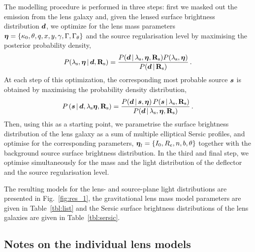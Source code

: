 \documentclass[a4paper,fleqn,usenatbib]{mnras}
\begin{document}
The modelling procedure is performed in three steps: first we masked out the emission from the lens galaxy and, given the lensed surface brightness distribution $\bmath d$, we optimize for the lens mass parameters $\bmath \eta = \{\kappa_0,\theta,q,x,y,\gamma,\Gamma,\Gamma_{\theta}\}$ and the source regularisation level by maximising the posterior probability density, 
\begin{equation}\label{equ:posterior}
    P(\lambda_{\rm{s}},\bmath \eta\,|\,\bmath d,\mathbf
      R_{\rm{s}})=\frac{P(\bmath d\,|\,\lambda_{\rm{s}},\bmath \eta,\mathbf
      R_{\rm{s}})P(\lambda_{\rm{s}},\bmath \eta)}{P(\bmath d\,|\,\mathbf
      R_{\rm{s}})}\,.
\end{equation}
At each step of this optimization, the corresponding most probable source $\bmath s$ is obtained by maximising the probability density distribution,
\begin{equation}
    P\left(\bmath s\,|\,\bmath d,\lambda_{\rm{s}}\bmath \eta,\mathbf R_{\rm{s}}\right)=\frac{P(\bmath d \,|\,\bmath s,\bmath \eta)\, P(\bmath s\,|\,\lambda_{\rm{s}},\mathbf R_{\rm{s}})}{P(\bmath     d \,|\,\lambda_{\rm{s}},\bmath \eta,\mathbf R_{\rm{s}})}\,.
   \label{eq:evidence} 
 \end{equation}
Then, using this as a starting point, we parametrise the surface brightness distribution of the lens galaxy as a sum of multiple elliptical Sersic profiles, and optimise for the corresponding parameters, $\bmath \eta_l =\{I_0, R_e, n, b, \theta\}$ together with the background source surface brightness distribution. In the third and final step, we optimise simultaneously for the mass and the light distribution of the deflector and the source regularisation level.

The resulting models for the lens- and source-plane light distributions are presented in Fig.~\ref{fig:res_1}, the gravitational lens mass model parameters are given in Table~\ref{tbl:list} and the Sersic surface brightness distributions of the lens galaxies are given in Table~\ref{tbl:sersic}.

\subsection{Notes on the individual lens models}
\end{document}
